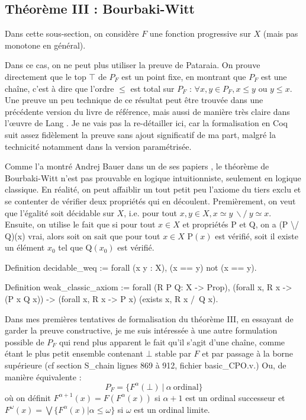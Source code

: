 \documentclass{article}
\newcommand\code[1]{{\fontfamily{lmtt}\selectfont #1}}
\theoremstyle{definition}
\begin{document}
\subsection{Théorème III : Bourbaki-Witt}

Dans cette sous-section, on considère $F$ une fonction progressive sur $X$ (mais pas monotone en général).

Dans ce cas, on ne peut plus utiliser la preuve de Pataraia. On prouve directement que le top $\top$ de $P_F$ est un point fixe, en montrant que $P_F$ est une chaîne, c'est à dire que l'ordre $\leq$ est total sur $P_F$ : $\forall x, y \in P_F, x \leq y$ ou $y \leq x$. Une preuve un peu technique de ce résultat peut être trouvée dans une précédente version du livre de référence, mais aussi de manière très claire dans l’œuvre de Lang \cite{lang02}.
Je ne vais pas la re-détailler ici, car la formalisation en Coq suit assez fidèlement la preuve sans ajout significatif de ma part, malgré la technicité notamment dans la version paramétrisée.

\medskip

Comme l'a montré Andrej Bauer dans un de ses papiers \cite{bw}, le théorème de Bourbaki-Witt n'est pas prouvable en logique intuitionniste, seulement en logique classique. En réalité, on peut affaiblir un tout petit peu l'axiome du tiers exclu et se contenter de vérifier deux propriétés qui en découlent. Premièrement, on veut que l'égalité soit décidable sur $X$, i.e. pour tout $x, y \in X, x \simeq y ~ \backslash/ ~ y \simeq x$. Ensuite, on utilise le fait que si pour tout $x \in X$ et propriétés \code{P} et \code{Q}, on a \code{(P \textbackslash/ Q)(x)} vrai, alors soit on sait que pour tout $x \in X$ \code{P}$(x)$ est vérifié, soit il existe un élément $x_0$ tel que \code{Q}$(x_0)$ est vérifié.

\begin{coq}
Definition decidable_weq := forall (x y : X), (x == y) \/ not (x == y).

Definition weak_classic_axiom := forall (R P Q: X -> Prop), 
	(forall x, R x -> (P x \/ Q x)) 
    -> (forall x, R x -> P x) \/ (exists x, R x /\ Q x).

\end{coq}

\medskip

Dans mes premières tentatives de formalisation du théorème III, en essayant de garder la preuve constructive, je me suis intéressée à une autre formulation possible de $P_F$ qui rend plus apparent le fait qu'il s'agit d'une chaîne, comme étant le plus petit ensemble contenant $\bot$ stable par $F$ et par passage à la borne supérieure (cf section \code{S\_chain} lignes 869 à 912, fichier \code{basic\_CPO.v}.) Ou, de manière équivalente :
$$ P_F = \{ F^\alpha(\bot) ~ | ~ \alpha ~ \text{ordinal} \}$$
où on définit $F^{\alpha + 1}(x) = F(F^\alpha(x))$ si $\alpha + 1$ est un ordinal successeur et $F^\omega(x) = \bigvee \{ F^\alpha(x) | \alpha \leqslant \omega \}$ si $\omega$ est un ordinal limite.
\end{document}
